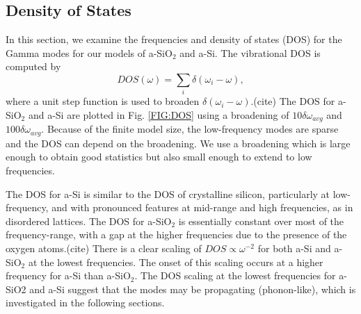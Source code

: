 \documentclass[aps,prb,onecolumn,preprint,superscriptaddress,footinbib,amsmath,amssymb,floatfix]{revtex4}
\begin{document}
\subsection{\label{S:DOS}Density of States}

In this section, we examine the frequencies and density of states (DOS)  
for the Gamma modes for our models of a-SiO$_2$ and a-Si. 
The vibrational DOS is computed by 
\begin{equation}\label{EQ:DOS}
DOS(\omega) = \sum_i \delta(\omega_i - \omega),
\end{equation}
where a unit step function is used to broaden 
$\delta(\omega_i - \omega)$.(cite)  
The DOS for a-SiO$_2$ and a-Si are plotted in Fig. \ref{FIG:DOS} 
using a broadening of $10\delta\omega_{avg}$ and $100\delta\omega_{avg}$.  
Because of the finite model size, the low-frequency modes are sparse and 
the DOS can depend on the broadening.
\cite{feldman_numerical_1999} We use a broadening which is large enough 
to obtain good statistics but also small enough to extend 
to low frequencies.   

The DOS for a-Si is similar to the 
DOS of crystalline silicon,
\cite{williams_numerical_1985,donadio_atomistic_2009} particularly 
at low-frequency, and with pronounced features at mid-range and high 
frequencies, as in disordered lattices.
\cite{larkin_predicting_2013,beltukov_ioffe-regel_2013} The DOS for 
a-SiO$_2$ is essentially constant over most of the frequency-range, 
with a gap at the higher frequencies due to the presence of 
the oxygen atoms.(cite)   
There is a clear scaling of $DOS \propto \omega^{-2}$ for both 
a-Si and a-SiO$_2$ at the lowest frequencies. 
The onset of this scaling occurs at a higher frequency 
for a-Si than a-SiO$_2$. The DOS scaling at the lowest 
frequencies for a-SiO2 and a-Si suggest that the modes may be 
propagating (phonon-like),  
which is investigated in the following sections. 

% 
% 
\end{document}
